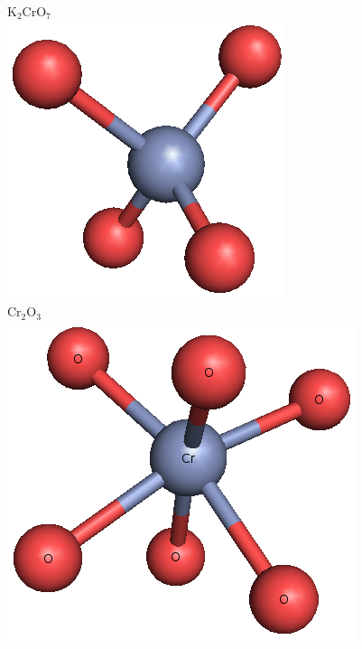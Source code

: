 \documentclass[10pt, xcolor=x11names, compress]{beamer}
\begin{document}
\begin{frame}
\begin{columns}[T]
\begin{column}{0.45\linewidth}
\begin{center}
      \end{center}
    \end{column}
    \begin{column}{0.05\linewidth}
      \begin{center}
        {\color{Blue3}K$_2$CrO$_7$}\\
        \includegraphics[width=\linewidth]{images/Cr/K2CrO7.png}\\[2ex]
        {\color{Red2}Cr$_2$O$_3$}\\
        \includegraphics[width=\linewidth]{images/Cr/Cr2O3.png}
      \end{center}
    \end{column}
  \end{columns}


\end{frame}
\end{document}
